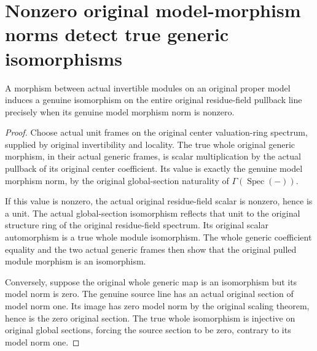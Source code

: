 \section{Nonzero original model-morphism norms detect true generic isomorphisms}

\begin{lemma}
\label{lem:actual-model-morphism-nonzero-generic-iso}
\leanok
{}
A morphism between actual invertible modules on an original proper
model induces a genuine isomorphism on the entire original
residue-field pullback line precisely when its genuine model
morphism norm is nonzero.
\end{lemma}
\begin{proof}
Choose actual unit frames on the original center valuation-ring
spectrum, supplied by original invertibility and locality. The
true whole original generic morphism, in their actual generic
frames, is scalar multiplication by the actual pullback of its
original center coefficient. Its value is exactly the genuine
model morphism norm, by the original global-section naturality of
$\Gamma(\operatorname{Spec}(-))$.

If this value is nonzero, the actual original residue-field scalar
is nonzero, hence is a unit. The actual global-section isomorphism
reflects that unit to the original structure ring of the original
residue-field spectrum. Its original scalar automorphism is a
true whole module isomorphism. The whole generic coefficient
equality and the two actual generic frames then show that the
original pulled module morphism is an isomorphism.

Conversely, suppose the original whole generic map is an
isomorphism but its model norm is zero. The genuine source line
has an actual original section of model norm one. Its image has
zero model norm by the original scaling theorem, hence is the
zero original section. The true whole isomorphism is injective
on original global sections, forcing the source section to be
zero, contrary to its model norm one.
\end{proof}

